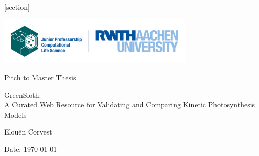\setlength{\fboxrule}{0.4pt}

[section] \setcounter{theo}{0}
\renewcommand{\thetheo}{\arabic{section}.\arabic{theo}}
\newenvironment{theo}[2][]{%
\refstepcounter{theo}%
\ifstrempty{#1}%
{\mdfsetup{%
frametitle={%
\tikz[baseline=(current bounding box.east),outer sep=0pt]
\node[anchor=east,rectangle,fill=Emerald!20]
{\strut Example~\thetheo};}}
}%
{\mdfsetup{%
frametitle={%
\tikz[baseline=(current bounding box.east),outer sep=0pt]
\node[anchor=east,rectangle,fill=Blue]
{\strut \textcolor{white}{Example~\thetheo:~#1}};}}%
}%
\mdfsetup{innertopmargin=10pt,linecolor=Emerald,%
linewidth=2pt,topline=true,%
frametitleaboveskip=\dimexpr-\ht\strutbox\relax
}
\begin{mdframed}[]\relax%
\label{#2}}{\end{mdframed}}

\thispagestyle{empty}

\vspace*{-5\baselineskip}
\hspace*{0.4\textwidth}\includegraphics[width=0.7\textwidth]{Figures/rwth_jp_computational_life_science_en_rgb.png}\\\vspace{1.5cm}


\vfill


\begin{center}
\Large{Pitch to Master Thesis}\\
\begin{bfseries}
    \begin{Huge}
        GreenSloth:\\ A Curated Web Resource for Validating and Comparing Kinetic Photosynthesis Models \par
    \end{Huge}
    \LARGE{Elou\"en Corvest}\\[1ex]
\end{bfseries}
\large{Date: \today}
\vfill

\end{center}

